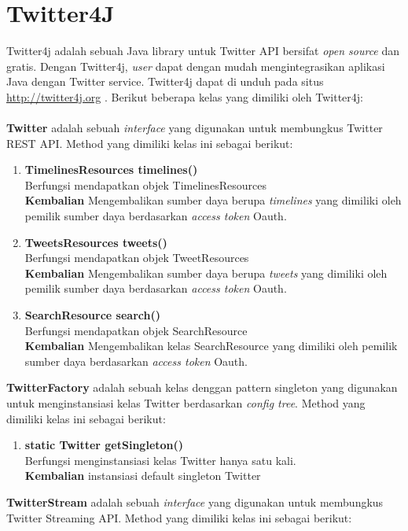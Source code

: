 \section{Twitter4J}
Twitter4j adalah sebuah Java library untuk Twitter API bersifat \textit{open source} dan gratis. Dengan Twitter4j, \textit{user} dapat dengan mudah mengintegrasikan aplikasi Java dengan Twitter service. Twitter4j dapat di unduh pada situs \url{http://twitter4j.org} \cite{Twitter4j:2015}. Berikut beberapa kelas yang dimiliki oleh Twitter4j:\\\\
\textbf{Twitter} adalah sebuah \textit{interface} yang digunakan untuk membungkus Twitter REST API. Method yang dimiliki kelas ini sebagai berikut:
\begin{enumerate}
	\item \textbf{TimelinesResources timelines()}\\
	Berfungsi mendapatkan objek TimelinesResources\\
	\textbf{Kembalian} Mengembalikan sumber daya berupa \textit{timelines} yang dimiliki oleh pemilik sumber daya berdasarkan \textit{access token} Oauth.
	\item \textbf{TweetsResources tweets()}\\
	Berfungsi mendapatkan objek TweetResources\\
	\textbf{Kembalian} Mengembalikan sumber daya berupa \textit{tweets} yang dimiliki oleh pemilik sumber daya berdasarkan \textit{access token} Oauth.
	\item \textbf{SearchResource search()}\\
	Berfungsi mendapatkan objek SearchResource\\
	\textbf{Kembalian} Mengembalikan kelas SearchResource yang dimiliki oleh pemilik sumber daya berdasarkan \textit{access token} Oauth.
\end{enumerate}
\textbf{TwitterFactory} adalah sebuah kelas denggan pattern singleton yang digunakan untuk menginstansiasi kelas Twitter berdasarkan \textit{config tree}. Method yang dimiliki kelas ini sebagai berikut:
\begin{enumerate} 
	\item \textbf{static Twitter getSingleton()}\\
	Berfungsi menginstansiasi kelas Twitter hanya satu kali.\\
	\textbf{Kembalian} instansiasi default singleton Twitter 
\end{enumerate}
\textbf{TwitterStream} adalah sebuah \textit{interface} yang digunakan untuk membungkus Twitter Streaming API. Method yang dimiliki kelas ini sebagai berikut:
